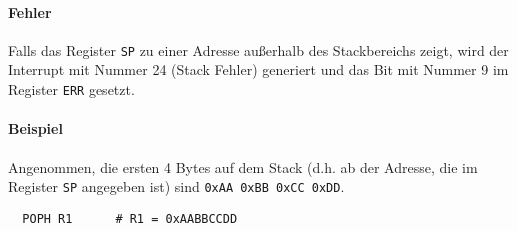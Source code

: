 \paragraph{Fehler}
Falls das Register \texttt{SP} zu einer Adresse außerhalb des Stackbereichs
zeigt, wird der Interrupt mit Nummer 24 (Stack Fehler)
generiert und das Bit mit Nummer 9 im Register \texttt{ERR} gesetzt.


\paragraph{Beispiel}
Angenommen, die ersten 4 Bytes auf dem Stack (d.h. ab der Adresse, die im
Register \texttt{SP} angegeben ist) sind \texttt{0xAA 0xBB 0xCC 0xDD}.
\begin{lstlisting}
  POPH R1      # R1 = 0xAABBCCDD
\end{lstlisting}
